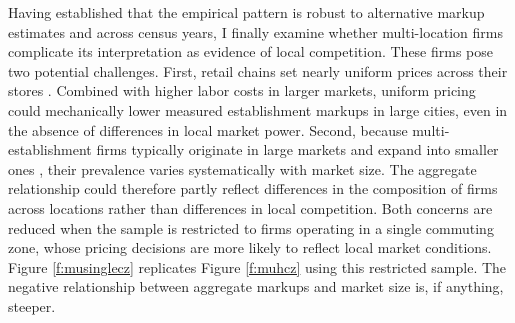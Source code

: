 Having established that the empirical pattern is robust to alternative markup estimates and across census years, I finally examine whether multi-location firms complicate its interpretation as evidence of local competition. These firms pose two potential challenges. First, retail chains set nearly uniform prices across their stores \parencite{DellaVigna&Gentzkow19}. Combined with higher labor costs in larger markets, uniform pricing could mechanically lower measured establishment markups in large cities, even in the absence of differences in local market power. Second, because multi-establishment firms typically originate in large markets and expand into smaller ones \parencite{Hsieh&RossiHansberg23}, their prevalence varies systematically with market size. The aggregate relationship could therefore partly reflect differences in the composition of firms across locations rather than differences in local competition. Both concerns are reduced when the sample is restricted to firms operating in a single commuting zone, whose pricing decisions are more likely to reflect local market conditions. Figure \ref{f:musinglecz} replicates Figure \ref{f:muhcz} using this restricted sample. The negative relationship between aggregate markups and market size is, if anything, steeper.

